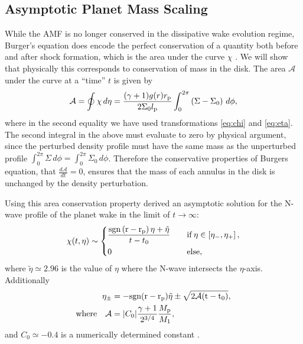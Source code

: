 \subsection{Asymptotic Planet Mass Scaling}

While the AMF is no longer conserved in the dissipative wake evolution regime, Burger's equation does encode the perfect conservation of a quantity both before and after shock formation, which is the area under the curve $\chi$ \citep{landau1959,whitham1999}.
We will show that physically this corresponds to conservation of mass in the disk.
The area $\mathcal{A}$ under the curve at a ``time'' $t$ is given by
\begin{align}
    \mathcal{A} = \oint \chi \, d\eta = \frac{(\gamma + 1)g(r)r_{\rm p}}{2 \Sigma_0 l_{\rm p}} \int_0^{2\pi}  \left( \Sigma - \Sigma_0 \right) \, d\phi, 
\end{align}
where in the second equality we have used transformations \ref{eq:chi} and \ref{eq:eta}.
The second integral in the above must evaluate to zero by physical argument, since the perturbed density profile must have the same mass as the unperturbed profile $\int_0^{2 \pi} \Sigma \, d\phi = \int_0^{2 \pi} \Sigma_0 \, d\phi$.
Therefore the conservative properties of Burgers equation, that $\frac{d\mathcal{A}}{dt}=0$, ensures that the mass of each annulus in the disk is unchanged by the density perturbation.

Using this area conservation property \citet{bollati2021} derived an asymptotic solution for the N-wave profile of the planet wake in the limit of $t\rightarrow\infty$:
\begin{align}
    \chi(t, \eta) \sim \begin{dcases}
        \frac{\rm{sgn}\left(r - r_{\rm p}\right) \eta + \tilde{\eta}}{t - t_0} \quad &\rm{if} \, \eta \in \left[\eta_-, \eta_+ \right], \\
        0 \quad &\rm{else},
    \end{dcases}
\end{align}
where $\tilde{\eta} \simeq 2.96$ is the value of $\eta$ where the N-wave intersects the $\eta$-axis.
Additionally
\begin{align} 
    \eta_\pm &= - \rm{sgn}(r - r_{\rm p}) \tilde{\eta} \pm \sqrt{2 \mathcal{A} (t - t_0)}, \\
    \rm{where} \quad \mathcal{A} &= |C_0| \frac{\gamma + 1}{2^{3/4}} \frac{M_{\rm p}}{M_1},
\end{align}
and $C_0 \simeq -0.4$ is a numerically determined constant \citep{bollati2020}.

